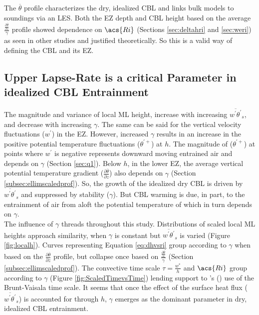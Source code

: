 The $\overline{\theta}$ profile characterizes the dry, idealized \acs{CBL} and links bulk models to soundings via an \acs{LES}.  Both the \acs{EZ} depth and \acs{CBL} height based on the average $\frac{\frac{\partial \overline{\theta}}{\partial z}}{\gamma}$ profile showed dependence on $\acs{Ri}$ (Sections \ref{sec:deltahri} and \ref{sec:weri}) as seen in other studies and justified theoretically.  So this is a valid way of defining the \acs{CBL} and its \acs{EZ}.  

\subsection{Upper Lapse-Rate is a critical Parameter in idealized \acs{CBL} Entrainment}

The magnitude and variance of local \acs{ML} height, increase with increasing $\overline{w^{'}\theta^{'}}_{s}$, and decrease with increasing $\gamma$.  The same can be said for the vertical velocity fluctuations ($w^{'}$) in the \acs{EZ}.  However, increased $\gamma$ results in an increase in the positive potential temperature fluctuations ($\theta^{'+}$) at $h$. The magnitude of ($\theta^{'+}$) at points where $w^{'}$ is negative represents downward moving entrained air and depends on $\gamma$ (Section \ref{sec:q1}).  Below $h$, in the lower \acs{EZ}, the average vertical potential temperature gradient ($\frac{\partial \overline{\theta}}{\partial z}$) also depends on $\gamma$ (Section \ref{subsec:ellimscaledprof}). So, the growth of the idealized dry \acs{CBL} is driven by $\overline{w^{'}\theta^{'}}_{s}$ and suppressed by stability ($\gamma$). But \acs{CBL} warming is due, in part, to the entrainment of air from aloft the potential temperature of which in turn depends on $\gamma$.\\

The influence of $\gamma$ threads throughout this study.  Distributions of scaled local \acs{ML} heights approach similarity, when $\gamma$ is constant but $\overline{w^{'}\theta^{'}}_{s}$ is varied (Figure \ref{fig:localh}).  Curves representing Equation \ref{eq:dhvsri} group according to $\gamma$ when based on the $\frac{\partial \overline{\theta}}{\partial z}$ profile, but collapse once based on $\frac{\frac{\partial \overline{\theta}}{\partial z}}{\gamma}$ (Section \ref{subsec:ellimscaledprof}).  The convective time scale $\tau = \frac{w^{*}}{h}$ and $\acs{Ri}$ group according to $\gamma$ (Figure \ref{fig:ScaledTimevsTime}) lending support to \citeauthor{FedConzMir04}'s (\citeyear{FedConzMir04}) use of the Brunt-Vaisala time scale.  It seems that once the effect of the surface heat flux ($\overline{w^{'}\theta^{'}}_{s}$) is accounted for through $h$, $\gamma$ emerges as the dominant parameter in dry, idealized \acs{CBL} entrainment.\\ 

